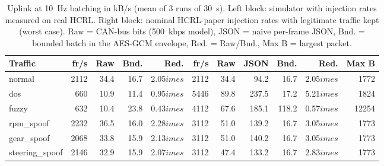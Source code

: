 \begin{table}[t]
\centering
\caption{Uplink at 10~Hz batching in kB/s (mean of 3 runs of 30~s). Left block: simulator with injection rates measured on real HCRL. Right block: nominal HCRL-paper injection rates with legitimate traffic kept (worst case). Raw = CAN-bus bits (500~kbps model), JSON = naive per-frame JSON, Bnd. = bounded batch in the AES-GCM envelope, Red. = Raw/Bnd., Max B = largest packet.}
\label{tab:sys_bandwidth}
\scriptsize
\begin{tabular}{lrrrr|rrrrrr}
\toprule
Traffic & fr/s & Raw & Bnd. & Red. & fr/s & Raw & JSON & Bnd. & Red. & Max B \\
\midrule
normal & 2112 & 34.4 & 16.7 & 2.05$	imes$ & 2112 & 34.4 & 94.2 & 16.7 & 2.05$	imes$ & 1772 \\
dos & 660 & 10.9 & 11.4 & 0.95$	imes$ & 5446 & 89.8 & 237.5 & 17.2 & 5.21$	imes$ & 1824 \\
fuzzy & 632 & 10.4 & 23.8 & 0.43$	imes$ & 4112 & 67.6 & 185.1 & 118.2 & 0.57$	imes$ & 12254 \\
rpm\_spoof & 2232 & 36.5 & 16.0 & 2.28$	imes$ & 3112 & 51.0 & 139.2 & 16.7 & 3.05$	imes$ & 1773 \\
gear\_spoof & 2068 & 33.8 & 15.9 & 2.13$	imes$ & 3112 & 51.0 & 140.2 & 16.7 & 3.05$	imes$ & 1773 \\
steering\_spoof & 2146 & 32.9 & 15.9 & 2.07$	imes$ & 3112 & 47.4 & 133.2 & 16.7 & 2.83$	imes$ & 1773 \\
\bottomrule
\end{tabular}
\end{table}
